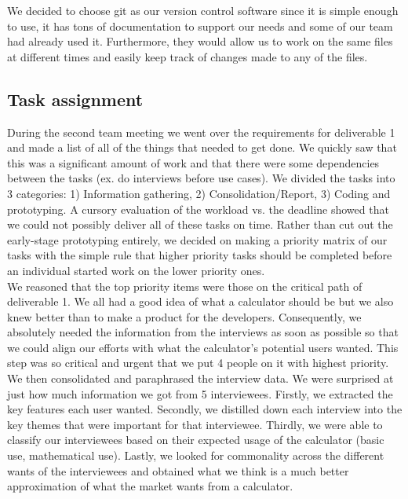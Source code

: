 \documentclass[a4paper, 12pt]{article}
\begin{document}
We decided to choose git as our version control software since it is simple enough to use, it has tons of documentation to support our needs and some of our team had already used it. Furthermore, they would allow us to work on the same files at different times and easily keep track of changes made to any of the files. 

\subsection{Task assignment}

During the second team meeting we went over the requirements for deliverable 1 and made a list of all of the things that needed to get done. We quickly saw that this was a significant amount of work and that there were some dependencies between the tasks (ex. do interviews before use cases). We divided the tasks into 3 categories: 1) Information gathering, 2) Consolidation/Report, 3) Coding and prototyping. A cursory evaluation of the workload vs. the deadline showed that we could not possibly deliver all of these tasks on time. Rather than cut out the early-stage prototyping entirely, we decided on making a priority matrix of our tasks with the simple rule that higher priority tasks should be completed before an individual started work on the lower priority ones. \\

We reasoned that the top priority items were those on the critical path of deliverable 1. We all had a good idea of what a calculator should be but we also knew better than to make a product for the developers. Consequently, we absolutely needed the information from the interviews as soon as possible so that we could align our efforts with what the calculator's potential users wanted. This step was so critical and urgent that we put 4 people on it with highest priority. \\

We then consolidated and paraphrased the interview data. We were surprised at just how much information we got from 5 interviewees. Firstly, we extracted the key features each user wanted. Secondly, we distilled down each interview into the key themes that were important for that interviewee. Thirdly, we were able to classify our interviewees based on their expected usage of the calculator (basic use, mathematical use). Lastly, we looked for commonality across the different wants of the interviewees and obtained what we think is a much better approximation of what the market wants from a calculator. \\
\end{document}
